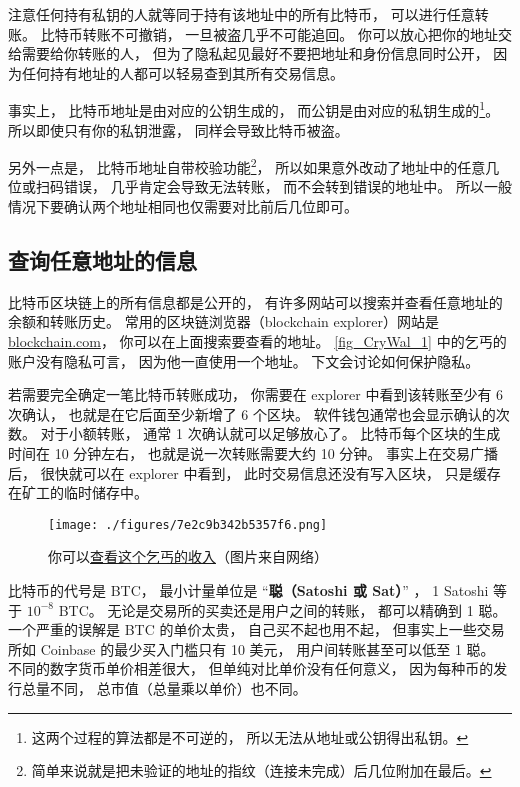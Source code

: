 注意任何持有私钥的人就等同于持有该地址中的所有比特币， 可以进行任意转账。 比特币转账不可撤销， 一旦被盗几乎不可能追回。 你可以放心把你的地址交给需要给你转账的人， 但为了隐私起见最好不要把地址和身份信息同时公开， 因为任何持有地址的人都可以轻易查到其所有交易信息。

事实上， 比特币地址是由对应的公钥生成的， 而公钥是由对应的私钥生成的\footnote{这两个过程的算法都是不可逆的， 所以无法从地址或公钥得出私钥。}。 所以即使只有你的私钥泄露， 同样会导致比特币被盗。

另外一点是， 比特币地址自带校验功能\footnote{简单来说就是把未验证的地址的指纹（连接未完成）后几位附加在最后。}， 所以如果意外改动了地址中的任意几位或扫码错误， 几乎肯定会导致无法转账， 而不会转到错误的地址中。 所以一般情况下要确认两个地址相同也仅需要对比前后几位即可。

\subsection{查询任意地址的信息}
比特币区块链上的所有信息都是公开的， 有许多网站可以搜索并查看任意地址的余额和转账历史。 常用的区块链浏览器（blockchain explorer）网站是 \href{https://blockchain.com}{blockchain.com}， 你可以在上面搜索要查看的地址。 \autoref{fig_CryWal_1} 中的乞丐的账户没有隐私可言， 因为他一直使用一个地址。 下文会讨论如何保护隐私。

若需要完全确定一笔比特币转账成功， 你需要在 explorer 中看到该转账至少有 6 次确认， 也就是在它后面至少新增了 6 个区块。 软件钱包通常也会显示确认的次数。 对于小额转账， 通常 1 次确认就可以足够放心了。 比特币每个区块的生成时间在 10 分钟左右， 也就是说一次转账需要大约 10 分钟。 事实上在交易广播后， 很快就可以在 explorer 中看到， 此时交易信息还没有写入区块， 只是缓存在矿工的临时储存中。
\begin{figure}[ht]
\centering
\texttt{[image: ./figures/7e2c9b342b5357f6.png]}
\caption{你可以\href{https://www.blockchain.com/btc/address/1DBqpfptUMizLDACvMVsrJFPdMtbgmZCk1}{查看这个乞丐的收入}（图片来自网络）} \label{fig_CryWal_1}
\end{figure}

比特币的代号是 BTC， 最小计量单位是 “\textbf{聪（Satoshi 或 Sat）}” ， 1 Satoshi 等于 $10^{-8}$ BTC。 无论是交易所的买卖还是用户之间的转账， 都可以精确到 1 聪。 一个严重的误解是 BTC 的单价太贵， 自己买不起也用不起， 但事实上一些交易所如 Coinbase 的最少买入门槛只有 10 美元， 用户间转账甚至可以低至 1 聪。 不同的数字货币单价相差很大， 但单纯对比单价没有任何意义， 因为每种币的发行总量不同， 总市值（总量乘以单价）也不同。

